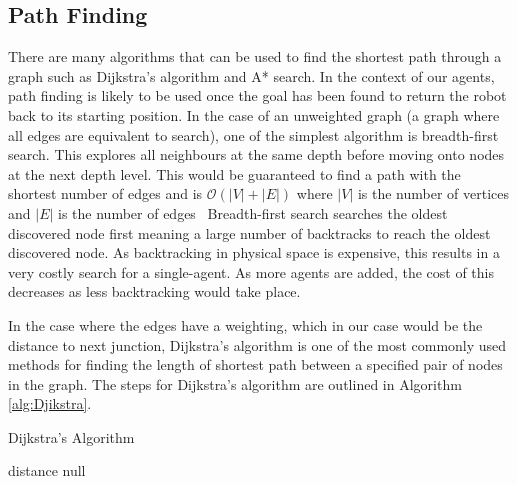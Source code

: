 \subsection{Path Finding}\label{litreview/maze/path}
There are many algorithms that can be used to find the shortest path 
through a graph such as Dijkstra's algorithm and A* search. In the 
context of our agents, path finding is likely to be used once 
the goal has been found to return the robot back to its starting 
position. In the case of an unweighted graph (a graph where all edges are 
equivalent to search), one of the simplest algorithm 
is breadth-first search. This explores all neighbours at the same depth 
before moving onto nodes at the next depth level. This would be guaranteed 
to find a path with the shortest number of edges and is $\mathcal{O}(|V| + |E|)$ 
where $|V|$ is the number of vertices and $|E|$ is the number of edges~\cite{cormen2009introduction}
Breadth-first search searches the oldest discovered node first meaning 
a large number of backtracks to reach the oldest discovered node. As 
backtracking in physical space is expensive, this results in a very 
costly search for a single-agent. As more agents are added, the cost of this 
decreases as less backtracking would take place. 

In the case where the edges have a weighting, which in our case would be the 
distance to next junction, Dijkstra's algorithm is one 
of the most commonly used methods for finding the length of shortest path between a specified pair of nodes in the graph. The steps for Dijkstra's algorithm are outlined in Algorithm \ref{alg:Djikstra}.

\begin{algorithm}
\caption{Dijkstra's Algorithm}
\label{alg:Djikstra}
\begin{algorithmic}
\ENDFOR
{}
\REPEAT
  	\RETURN distance
  \ENDIF
    \RETURN null
  \ENDIF
  
    \ENDIF
  \ENDFOR
  
\end{algorithmic}
\end{algorithm}

